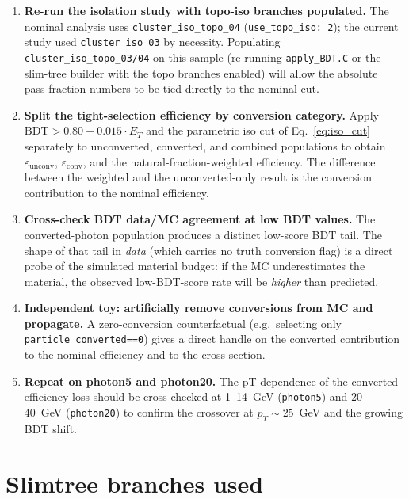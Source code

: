 \documentclass[11pt,a4paper]{article}
\begin{document}
\begin{enumerate}
  \item \textbf{Re-run the isolation study with topo-iso branches populated.}
  The nominal analysis uses \texttt{cluster\_iso\_topo\_04}
  (\texttt{use\_topo\_iso: 2}); the current study used \texttt{cluster\_iso\_03}
  by necessity. Populating \texttt{cluster\_iso\_topo\_03/04} on this sample
  (re-running \texttt{apply\_BDT.C} or the slim-tree builder with the topo
  branches enabled) will allow the absolute pass-fraction numbers to be
  tied directly to the nominal cut.
  \item \textbf{Split the tight-selection efficiency by conversion category.}
  Apply $\mathrm{BDT} > 0.80 - 0.015 \cdot E_T$ and the parametric iso cut
  of Eq.~\ref{eq:iso_cut} separately to unconverted, converted, and
  combined populations to obtain
  $\varepsilon_{\mathrm{unconv}}$, $\varepsilon_{\mathrm{conv}}$, and the
  natural-fraction-weighted efficiency. The difference between the
  weighted and the unconverted-only result is the conversion contribution
  to the nominal efficiency.
  \item \textbf{Cross-check BDT data/MC agreement at low BDT values.} The
  converted-photon population produces a distinct low-score BDT tail. The
  shape of that tail in \emph{data} (which carries no truth conversion
  flag) is a direct probe of the simulated material budget: if the MC
  underestimates the material, the observed low-BDT-score rate will be
  \emph{higher} than predicted.
  \item \textbf{Independent toy: artificially remove conversions from MC
  and propagate.} A zero-conversion counterfactual (e.g.\ selecting only
  \texttt{particle\_converted==0}) gives a direct handle on the converted
  contribution to the nominal efficiency and to the cross-section.
  \item \textbf{Repeat on photon5 and photon20.} The pT dependence of the
  converted-efficiency loss should be cross-checked at 1--14~GeV
  (\texttt{photon5}) and 20--40~GeV (\texttt{photon20}) to confirm the
  crossover at $p_T \sim 25$~GeV and the growing BDT shift.
\end{enumerate}


\appendix
\section{Slimtree branches used}
\label{app:branches}
\end{document}
